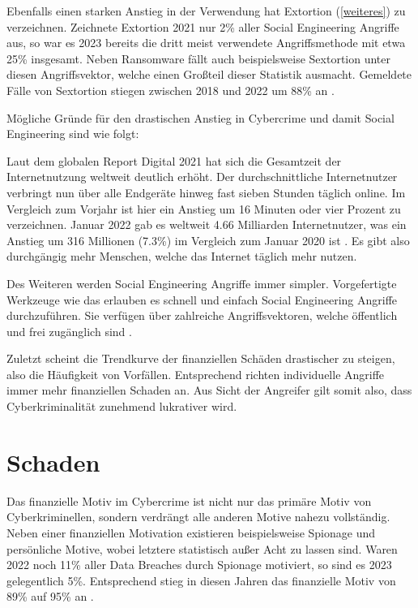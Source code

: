 Ebenfalls einen starken Anstieg in der Verwendung hat Extortion (\autoref{weiteres}) zu verzeichnen.
Zeichnete Extortion 2021 nur 2\% aller Social Engineering Angriffe aus, so war es 2023 bereits die dritt meist verwendete Angriffsmethode mit etwa 25\% insgesamt.
Neben Ransomware fällt auch beispielsweise Sextortion unter diesen Angriffsvektor, welche einen Großteil dieser Statistik ausmacht.
Gemeldete Fälle von Sextortion stiegen zwischen 2018 und 2022 um 88\% an .

Mögliche Gründe für den drastischen Anstieg in Cybercrime und damit Social Engineering sind wie folgt:

Laut dem globalen Report Digital 2021 hat sich die Gesamtzeit der Internetnutzung weltweit deutlich erhöht.
Der durchschnittliche Internetnutzer verbringt nun über alle Endgeräte hinweg fast sieben Stunden täglich online.
Im Vergleich zum Vorjahr ist hier ein Anstieg um 16 Minuten oder vier Prozent zu verzeichnen.
Januar 2022 gab es weltweit 4.66 Milliarden Internetnutzer, was ein Anstieg um 316 Millionen (7.3\%) im Vergleich zum Januar 2020 ist .
Es gibt also durchgängig mehr Menschen, welche das Internet täglich mehr nutzen.

Des Weiteren werden Social Engineering Angriffe immer simpler.
Vorgefertigte Werkzeuge wie das  erlauben es schnell und einfach Social Engineering Angriffe durchzuführen.
Sie verfügen über zahlreiche Angriffsvektoren, welche öffentlich und frei zugänglich sind .

Zuletzt scheint die Trendkurve der finanziellen Schäden drastischer zu steigen, also die Häufigkeit von Vorfällen.
Entsprechend richten individuelle Angriffe immer mehr finanziellen Schaden an.
Aus Sicht der Angreifer gilt somit also, dass Cyberkriminalität zunehmend lukrativer wird.

\section{Schaden}

Das finanzielle Motiv im Cybercrime ist nicht nur das primäre Motiv von Cyberkriminellen, sondern verdrängt alle anderen Motive nahezu vollständig.
Neben einer finanziellen Motivation existieren beispielsweise Spionage und persönliche Motive, wobei letztere statistisch außer Acht zu lassen sind.
Waren 2022 noch 11\% aller Data Breaches durch Spionage motiviert, so sind es 2023 gelegentlich 5\%.
Entsprechend stieg in diesen Jahren das finanzielle Motiv von 89\% auf 95\% an .

